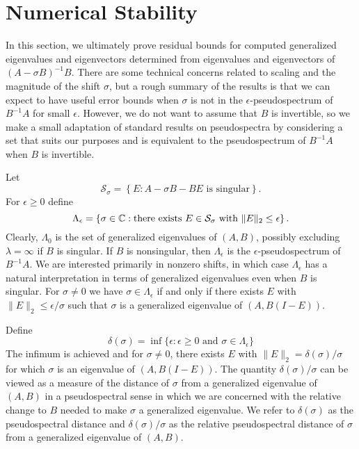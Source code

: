 \documentclass[12pt]{article}
\begin{document}
\section{Numerical Stability}
\label{sec:numerical-stability}

In this section, we ultimately prove residual bounds for computed
generalized eigenvalues and eigenvectors determined from eigenvalues
and eigenvectors of $(A-\sigma B)^{-1}B$.  There are some technical
concerns related to scaling and the magnitude of the shift $\sigma$,
but a rough summary of the results is that we can expect to have
useful error bounds when $\sigma$ is not in the
$\epsilon$-pseudospectrum of $B^{-1}A$ for small $\epsilon$.  However,
we do not want to assume that $B$ is invertible, so we make a small
adaptation of standard results on pseudospectra by considering a set
that suits our purposes and is equivalent to the pseudospectrum of
$B^{-1}A$ when $B$ is invertible.

Let
\begin{equation}
  \label{eq:S_def}
  \mathcal{S}_\sigma = 
  \left\{ E : \mbox{$A - \sigma B - B E$ is singular} \right\}.
\end{equation}
For $\epsilon \geq 0$ define
\begin{equation}
  \label{eq:pseudo_def}
  \Lambda_\epsilon =
  \left\{ \sigma \in {\mathbb C}: \mbox{there exists $E\in \mathcal{S}_\sigma$
      with $\|E\|_2\leq \epsilon$}
  \right\}.
\end{equation}
Clearly, $\Lambda_0$ is the set of generalized eigenvalues of $(A,B)$,
possibly excluding $\lambda = \infty$ if $B$ is singular.  If $B$ is
nonsingular, then $\Lambda_\epsilon$ is the $\epsilon$-pseudospectrum
of $B^{-1} A$.  We are interested primarily in nonzero shifts, in
which case $\Lambda_\epsilon$ has a natural interpretation in terms of
generalized eigenvalues even when $B$ is singular.  For
$\sigma \neq 0$ we have $\sigma\in\Lambda_\epsilon$ if and only if
there exists $E$ with $\|E\|_2 \leq \epsilon/\sigma$ such that
$\sigma$ is a generalized eigenvalue of $(A, B(I-E))$.

Define
\begin{equation}
  \label{eq:delta_def}
  \delta(\sigma) = \inf \{ \epsilon :
  \mbox{$\epsilon \geq 0$ and $\sigma \in \Lambda_\epsilon$}\}
\end{equation}
The infimum is achieved and for $\sigma \neq 0$, there exists $E$ with
$\|E\|_2= \delta(\sigma)/\sigma$ for which $\sigma$ is an eigenvalue
of $(A, B(I-E))$.  The quantity $\delta(\sigma)/\sigma$ can be viewed
as a measure of the distance of $\sigma$ from a generalized eigenvalue
of $(A,B)$ in a pseudospectral sense in which we are concerned with
the relative change to $B$ needed to make $\sigma$ a generalized
eigenvalue.  We refer to $\delta(\sigma)$ as the pseudospectral
distance and $\delta(\sigma)/\sigma$ as the relative pseudospectral
distance of $\sigma$ from a generalized eigenvalue of $(A,B)$.
\end{document}
